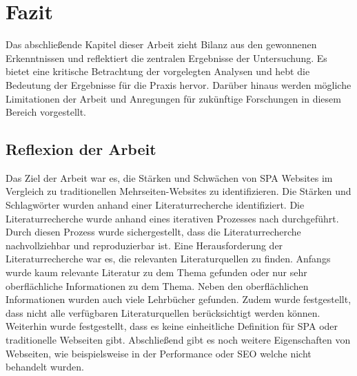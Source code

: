 \section{Fazit}
Das abschließende Kapitel dieser Arbeit zieht Bilanz aus den gewonnenen Erkenntnissen und reflektiert die zentralen Ergebnisse der Untersuchung.
Es bietet eine kritische Betrachtung der vorgelegten Analysen und hebt die Bedeutung der Ergebnisse für die Praxis hervor.
Darüber hinaus werden mögliche Limitationen der Arbeit und Anregungen für zukünftige Forschungen in diesem Bereich vorgestellt.

\subsection{Reflexion der Arbeit}
Das Ziel der Arbeit war es, die Stärken und Schwächen von \ac{SPA} Websites im Vergleich zu traditionellen Mehrseiten-Websites zu identifizieren.
Die Stärken und Schlagwörter wurden anhand einer Literaturrecherche identifiziert.
Die Literaturrecherche wurde anhand eines iterativen Prozesses nach \citeauthor{conf/ecis/BrockeSNRPC09} durchgeführt.
Durch diesen Prozess wurde sichergestellt, dass die Literaturrecherche nachvollziehbar und reproduzierbar ist.
Eine Herausforderung der Literaturrecherche war es, die relevanten Literaturquellen zu finden.
Anfangs wurde kaum relevante Literatur zu dem Thema gefunden oder nur sehr oberflächliche Informationen zu dem Thema.
Neben den oberflächlichen Informationen wurden auch viele Lehrbücher gefunden.
Zudem wurde festgestellt, dass nicht alle verfügbaren Literaturquellen berücksichtigt werden können.
Weiterhin wurde festgestellt, dass es keine einheitliche Definition für \ac{SPA} oder traditionelle Webseiten gibt.
Abschließend gibt es noch weitere Eigenschaften von Webseiten, wie beispielsweise in der Performance oder \ac{SEO} welche nicht behandelt wurden.


